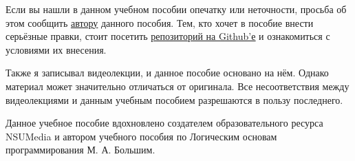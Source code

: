 \documentclass[17pt, a4paper]{extarticle}
\begin{document}

	Если вы нашли в данном учебном пособии опечатку или неточности, просьба об этом
	сообщить \href{https://vk.com/id212526330}{\underline{автору}} данного пособия.
	Тем, кто хочет в пособие внести серьёзные правки, стоит посетить
	\href{https://github.com/mu2so4/Computational-Mathematics-Book}
	{\underline{репозиторий на Github'е}} и ознакомиться с условиями их внесения.

	Также я записывал видеолекции, и данное пособие основано на нём. Однако
	материал может значительно отличаться от оригинала. Все несоответствия
	между видеолекциями и данным учебным пособием разрешаются в пользу
	последнего.
	\newline\newline

	Данное учебное пособие вдохновлено создателем образовательного ресурса
	NSUMedia и автором учебного пособия по Логическим основам
	программирования М. А. Большим.
\end{document}
